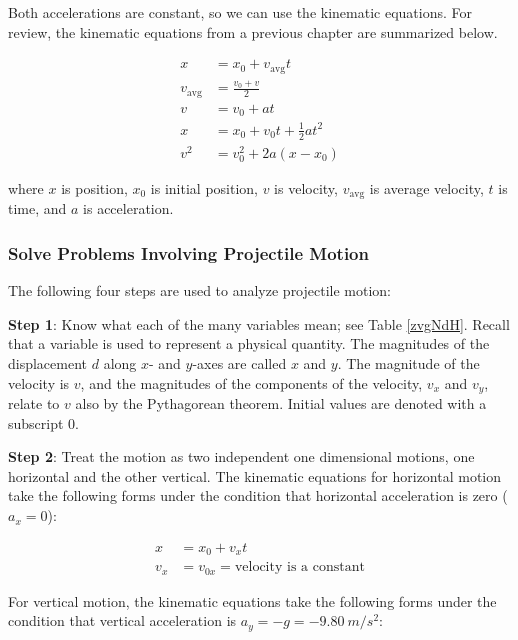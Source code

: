 \documentclass[main-physics.tex]{subfiles}
\begin{document}
Both accelerations are constant, so we can use the kinematic equations. For review, the kinematic equations from a previous chapter are summarized below.

\begin{align}
    x &= x_0 + v_{\text{avg}} t\\[0.5ex]
    v_{\text{avg}} &= \frac{v_0 + v}{2}\\[0.5ex]
    v &= v_0 + a t\\[0.5ex]
    x &= x_0 + v_0 t + \frac{1}{2} a t^2\\[0.5ex]
    v^2 &= v_0^2 + 2 a (x - x_0)
\end{align}

where $x$ is position, $x_0$ is initial position, $v$ is velocity, $v_{\text{avg}}$ is average velocity, $t$ is time, and $a$ is acceleration.

\subsubsection*{Solve Problems Involving Projectile Motion}

The following four steps are used to analyze projectile motion:

\vspace{1em}

\textbf{Step 1}: Know what each of the many variables mean; see Table \ref{zvgNdH}. Recall that a variable is used to represent a physical quantity. The magnitudes of the displacement $d$ along $x$- and $y$-axes are called $x$ and  $y$. The magnitude of the velocity is $v$, and the magnitudes of the components of the velocity, $v_x$ and $v_y$, relate to $v$ also by the Pythagorean theorem. Initial values are denoted with a subscript 0.

\vspace{1em}

\textbf{Step 2}: Treat the motion as two independent one dimensional motions, one horizontal and the other vertical. The kinematic equations for horizontal motion take the following forms under the condition that horizontal acceleration is zero ($a_x = 0$):

\begin{align}
    x &= x_0 + v_x t \label{7fMAPG}\\[0.5ex]
    v_x &= v_{0x} = \text{velocity is a constant} \label{dCvDf4}
\end{align}

For vertical motion, the kinematic equations take the following forms under the condition that vertical acceleration is $a_y = -g = \SI{-9.80}{m/s^2}$:
\end{document}
